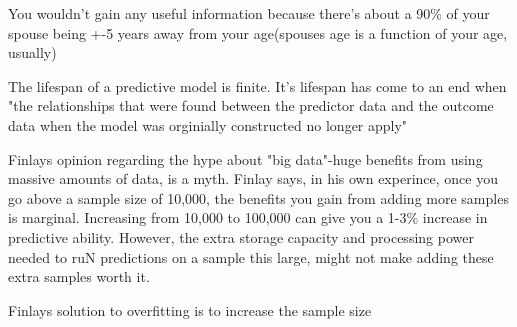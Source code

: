 \documentclass[12pt]{article}
\begin{document}
\begin{enumerate}
You wouldn't gain any useful information because there's about a 90\% of your spouse being +-5 years away from your age(spouses age is a function of your age, usually)

The lifespan of a predictive model is finite. It's lifespan has come to an end when "the relationships that were found between the predictor data and the outcome data when the model was orginially constructed no longer apply"




Finlays opinion regarding the hype about "big data"-huge benefits from using massive amounts of data, is a myth. Finlay says, in his own experince, once you go above a sample size of 10,000, the benefits you gain from adding more samples is marginal. Increasing from 10,000 to 100,000 can give you a 1-3\% increase in predictive ability. However, the extra storage capacity and processing power needed to ruN predictions on a sample this large, might not make adding these extra samples worth it.

Finlays solution to overfitting is to increase the sample size
\end{enumerate}


\end{document}
